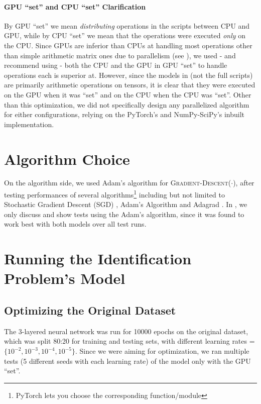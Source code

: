 \paragraph{GPU ``set'' and CPU ``set'' Clarification}
By GPU ``set'' we mean \textit{distributing} operations in the scripts between CPU and GPU, while by CPU ``set'' we mean that the operations were executed \textit{only} on the CPU. Since GPUs are inferior than CPUs at handling most operations other than simple arithmetic matrix ones due to parallelism (see ), we used - and recommend using - both the CPU and the GPU in GPU ``set'' to handle operations each is superior at. However, since the models in  (not the full scripts) are primarily arithmetic operations on  tensors, it is clear that they were executed on the GPU when it was ``set'' and on the CPU when the CPU was ``set''. Other than this optimization, we did not specifically design any parallelized algorithm for either configurations, relying on the PyTorch's and NumPy-SciPy's inbuilt implementation.

\section{Algorithm Choice} \label{sec:Algorithm Choice}
On the algorithm side, we used Adam's algorithm for \textsc{Gradient-Descent}($\cdot$), after testing performances of several algorithms\footnote{PyTorch lets you choose the corresponding function/module} including but not limited to Stochastic Gradient Descent (SGD) \cite{SGD}, Adam's Algorithm \cite{Adam} and Adagrad \cite{Adagrad}. In , we only discuss and show tests using the Adam's algorithm, since it was found to work best with both models over all test runs.

\section{Running the Identification Problem's Model} \label{sec:Running the Identification Problem's Model}
\subsection{Optimizing the Original Dataset} \label{sec:Identification Problem-Optimizing the Original Dataset}
The 3-layered neural network was run for 10000 epochs on the original dataset, which was split 80:20 for training and testing sets, with different learning rates = $\{10^{-2}, 10^{-3}, 10^{-4}, 10^{-5}\}$. Since we were aiming for optimization, we ran multiple tests (5 different seeds with each learning rate) of the model only with the GPU ``set''.


